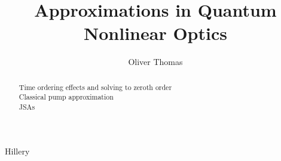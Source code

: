 \documentclass[10pt]{IEEEtran}
\begin{document}
\title{Approximations in Quantum Nonlinear Optics }
\author{Oliver Thomas}

\maketitle


\begin{abstract}
    Time ordering effects and solving to zeroth order \\
    Classical pump approximation \\
    JSAs \\
\end{abstract}

Hillery \cite{drummond2014quantum}



\begin{comment}
\begin{figure}[!h]
\centering
\texttt{[image: myfigure.png]}
\caption{Simulation results for the network.}
\label{fig_sim}
\end{figure}


Subfigure
\begin{figure*}[!h]
\centering
\subfloat[Case I]{\texttt{[image: subfigcase1]}
\label{fig_first_case}}
\hfil
\subfloat[Case II]{\texttt{[image: subfigcase2]}
\label{fig_second_case}}
\caption{Simulation results for the network.}
\label{fig_sim}
\end{figure*}

table 
\begin{table}[!h]
\renewcommand{\arraystretch}{1.3}
\caption{A Simple Example Table}
\label{table_example}
\centering
\begin{tabular}{c||c}
\hline
\bfseries First & \bfseries Next\\
\hline\hline
1.0 & 2.0\\
\hline
\end{tabular}
\end{table}

\end{comment}




\end{document}
